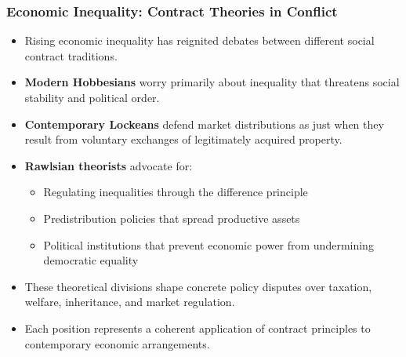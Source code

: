\documentclass[aspectratio=169]{beamer}
\begin{document}
\begin{frame}
  \frametitle{Economic Inequality: Contract Theories in Conflict}
  
  \begin{itemize}
    \item Rising economic inequality has reignited debates between different social contract traditions.
    \item \textbf{Modern Hobbesians} worry primarily about inequality that threatens social stability and political order.
    \item \textbf{Contemporary Lockeans} defend market distributions as just when they result from voluntary exchanges of legitimately acquired property.
    \item \textbf{Rawlsian theorists} advocate for:
      \begin{itemize}
        \item Regulating inequalities through the difference principle
        \item Predistribution policies that spread productive assets
        \item Political institutions that prevent economic power from undermining democratic equality
      \end{itemize}
    \item These theoretical divisions shape concrete policy disputes over taxation, welfare, inheritance, and market regulation.
    \item Each position represents a coherent application of contract principles to contemporary economic arrangements.
  \end{itemize}
\end{frame}
\end{document}

